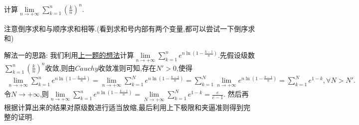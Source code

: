 \documentclass[lang=cn,newtx,10pt,scheme=chinese]{elegantbook}
\begin{document}
\begin{example}
计算$\underset{n\rightarrow +\infty}{\lim}\sum\limits_{k=1}^n{\left( \frac{k}{n} \right) ^n}$.
\end{example}
\begin{remark}
注意倒序求和与顺序求和相等.(看到求和号内部有两个变量,都可以尝试一下倒序求和)
\end{remark}
\begin{note}
{\color{blue}解法一}的思路:
我们利用\hyperref[计算二元数列求和的极限的思路]{上一题的想法}计算$\underset{n\rightarrow +\infty}{\lim}\sum\limits_{k=1}^n{e^{n\ln \left( 1-\frac{k-1}{n} \right)}}$.先假设级数$\sum\limits_{k=1}^n{\left( \frac{k}{n} \right) ^n}$收敛,则由$Cauchy$收敛准则可知,存在$N'>0$,使得
\begin{align*}
\underset{n\rightarrow +\infty}{\lim}\sum\limits_{k=1}^n{e^{n\ln \left( 1-\frac{k-1}{n} \right)}}=\underset{n\rightarrow +\infty}{\lim}\sum\limits_{k=1}^N{e^{n\ln \left( 1-\frac{k-1}{n} \right)}}=\sum\limits_{k=1}^N{\underset{n\rightarrow +\infty}{\lim}e^{n\ln \left( 1-\frac{k-1}{n} \right)}=\sum\limits_{k=1}^N{e^{1-k}},\forall N>N'}.
\end{align*}
令$N\to +\infty$,则$\underset{n\rightarrow +\infty}{\lim}\sum\limits_{k=1}^n{e^{n\ln \left( 1-\frac{k-1}{n} \right)}}=\underset{N\rightarrow +\infty}{\lim}\sum\limits_{k=1}^N{e^{1-k}}=\frac{e}{e-1}$.
然后再根据计算出来的结果对原级数进行适当放缩,最后利用上下极限和夹逼准则得到完整的证明.
\end{note}
\end{document}
